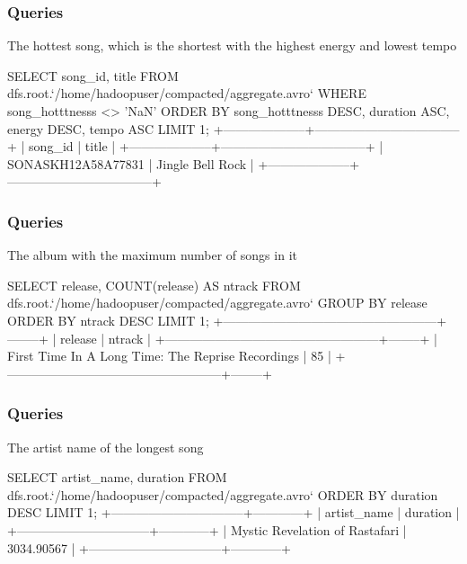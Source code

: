 \documentclass{beamer}
\begin{document}
\begin{frame}[fragile]
    \frametitle{Queries}

    \begin{center}
       \footnotesize The hottest song, which is the shortest with the highest energy and lowest tempo
    \end{center}
    
    \begin{mycodetiny}
        SELECT 
            song_id,
            title
        FROM dfs.root.`/home/hadoopuser/compacted/aggregate.avro`
        WHERE song_hotttnesss <> 'NaN'
        ORDER BY 
            song_hotttnesss DESC,
            duration ASC,
            energy DESC,
            tempo ASC
        LIMIT 1;
        +--------------------+-----------------------------------+
        |      song_id       |                title              |
        +--------------------+-----------------------------------+
        | SONASKH12A58A77831 | Jingle Bell Rock                  |
        +--------------------+-----------------------------------+
    \end{mycodetiny}
\end{frame}

\begin{frame}[fragile]
    \frametitle{Queries}

    \begin{center}
        The album with the maximum number of songs in it 
    \end{center}
    
    \begin{mycodetiny}
        SELECT 
            release,
            COUNT(release) AS ntrack
        FROM dfs.root.`/home/hadoopuser/compacted/aggregate.avro`
        GROUP BY release
        ORDER BY ntrack DESC
        LIMIT 1;
        +---------------------------------------------------+--------+
        |                      release                      | ntrack |
        +---------------------------------------------------+--------+
        | First Time In A Long Time: The Reprise Recordings | 85     |
        +---------------------------------------------------+--------+
    \end{mycodetiny}
\end{frame}

\begin{frame}[fragile]
    \frametitle{Queries}

    \begin{center}
        The artist name of the longest song
    \end{center}
    
    \begin{mycodetiny}
        SELECT 
            artist_name,
            duration
        FROM dfs.root.`/home/hadoopuser/compacted/aggregate.avro`
        ORDER BY duration DESC
        LIMIT 1;
        +--------------------------------+------------+
        |          artist_name           |  duration  |
        +--------------------------------+------------+
        | Mystic Revelation of Rastafari | 3034.90567 |
        +--------------------------------+------------+
    \end{mycodetiny}
\end{frame}
\end{document}
